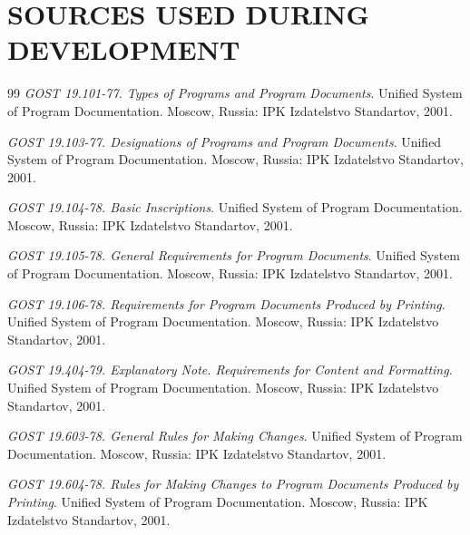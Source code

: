 \documentclass[12pt,a4paper]{extarticle}
\begin{document}
\clearpage
\pagestyle{appendix}

\section*{SOURCES USED DURING DEVELOPMENT}

\renewcommand{\refname}{}
\begin{thebibliography}{99}
\emph{GOST 19.101-77. Types of Programs and Program Documents}. Unified System of Program Documentation. Moscow, Russia: IPK Izdatelstvo Standartov, 2001.

\emph{GOST 19.103-77. Designations of Programs and Program Documents}. Unified System of Program Documentation. Moscow, Russia: IPK Izdatelstvo Standartov, 2001.

\emph{GOST 19.104-78. Basic Inscriptions}. Unified System of Program Documentation. Moscow, Russia: IPK Izdatelstvo Standartov, 2001.

\emph{GOST 19.105-78. General Requirements for Program Documents}. Unified System of Program Documentation. Moscow, Russia: IPK Izdatelstvo Standartov, 2001.

\emph{GOST 19.106-78. Requirements for Program Documents Produced by Printing}. Unified System of Program Documentation. Moscow, Russia: IPK Izdatelstvo Standartov, 2001.

\emph{GOST 19.404-79. Explanatory Note. Requirements for Content and Formatting}. Unified System of Program Documentation. Moscow, Russia: IPK Izdatelstvo Standartov, 2001.

\emph{GOST 19.603-78. General Rules for Making Changes}. Unified System of Program Documentation. Moscow, Russia: IPK Izdatelstvo Standartov, 2001.

\emph{GOST 19.604-78. Rules for Making Changes to Program Documents Produced by Printing}. Unified System of Program Documentation. Moscow, Russia: IPK Izdatelstvo Standartov, 2001.
\end{thebibliography}
\end{document}
